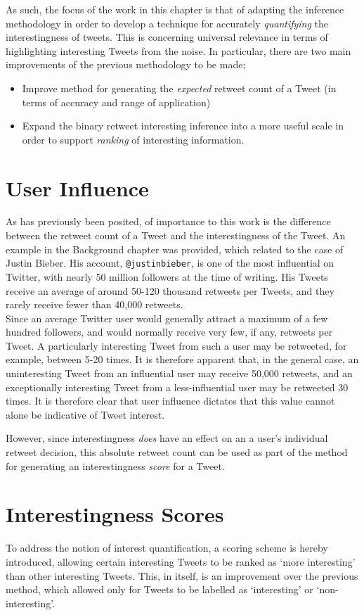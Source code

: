 As such, the focus of the work in this chapter is that of adapting the inference methodology in order to develop a technique for accurately \textit{quantifying} the interestingness of tweets. This is concerning universal relevance in terms of highlighting interesting Tweets from the noise. In particular, there are two main improvements of the previous methodology to be made;
\begin{itemize}
    \item Improve method for generating the \textit{expected} retweet count of a Tweet (in terms of accuracy and range of application)
    \item Expand the binary retweet interesting inference into a more useful scale in order to support \textit{ranking} of interesting information.
\end{itemize}


\section{User Influence}
As has previously been posited, of importance to this work is the difference between the retweet count of a Tweet and the interestingness of the Tweet. An example in the Background chapter was provided, which related to the case of Justin Bieber. His account, \texttt{@justinbieber}, is one of the most influential on Twitter, with nearly 50 million followers at the time of writing. His Tweets receive an average of around 50-120 thousand retweets per Tweets, and they rarely receive fewer than 40,000 retweets.\\
Since an average Twitter user would generally attract a maximum of a few hundred followers, and would normally receive very few, if any, retweets per Tweet. A particularly interesting Tweet from such a user may be retweeted, for example, between 5-20 times. It is therefore apparent that, in the general case, an uninteresting Tweet from an influential user may receive 50,000 retweets, and an exceptionally interesting Tweet from a less-influential user may be retweeted 30 times. It is therefore clear that user influence dictates that this value cannot alone be indicative of Tweet interest.

However, since interestingness \textit{does} have an effect on an a user's individual retweet decision, this absolute retweet count can be used as part of the method for generating an interestingness \textit{score} for a Tweet.


\section{Interestingness Scores}
To address the notion of interest quantification, a scoring scheme is hereby introduced, allowing certain interesting Tweets to be ranked as `more interesting' than other interesting Tweets. This, in itself, is an improvement over the previous method, which allowed only for Tweets to be labelled as `interesting' or `non-interesting'.

